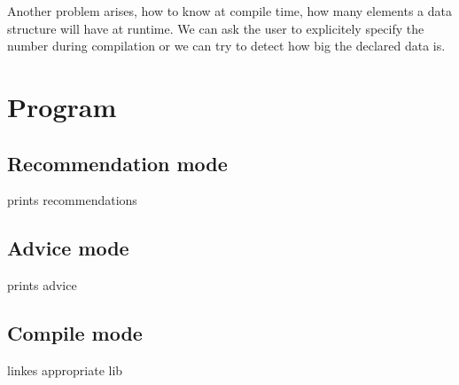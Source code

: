 \documentclass[11pt]{article}
\begin{document}
		Another problem arises, how to know at compile time, how many elements a data structure will have at runtime. We can ask the user to explicitely
		specify the number during compilation or we can try to detect how big the declared data is.
\section{Program}
	\subsection{Recommendation mode}
		prints recommendations
	\subsection{Advice mode}
		prints advice
	\subsection{Compile mode}
		linkes appropriate lib
\end{document}
